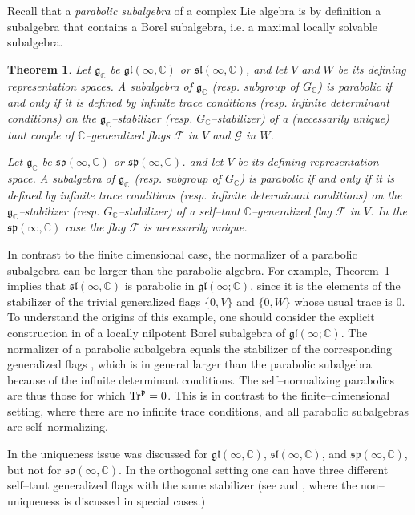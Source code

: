 \documentclass[oneside,leqno,11pt]{article}
\def\gg{\mathfrak{g}}
\def\ggl{\mathfrak{gl}}
\def\gp{\mathfrak{p}}
\def\gsl{\mathfrak{sl}}
\def\gso{\mathfrak{so}}
\def\gsp{\mathfrak{sp}}
\def\Tr{{\rm Tr}}
\def\C{\mathbb{C}}
\def\cF{\mathcal{F}}
\def\cG{\mathcal{G}}
\newtheorem{theorem}[equation]{Theorem}
\begin{document}
Recall that a \emph{parabolic subalgebra} of a complex Lie algebra is by definition a subalgebra that contains a Borel subalgebra, i.e. a maximal locally solvable subalgebra.

\begin{theorem} {\rm \cite{DC2}} \label{complex-parab}
Let $\gg_\C$ be $\ggl(\infty,\C)$ or $\gsl(\infty,\C)$, and let
$V$ and $W$ be its defining representation spaces.
A subalgebra of $\gg_\C$ (resp. subgroup of $G_\C$) is 
parabolic if and only if it is defined by infinite trace conditions 
(resp. infinite determinant conditions) on the 
$\gg_\C$--stabilizer (resp. $G_\C$--stabilizer) of 
a (necessarily unique) taut couple of $\C$--generalized flags $\cF$ 
in $V$ and $\cG$ in $W$.

Let $\gg_\C$ be $\gso(\infty,\C)$ or $\gsp(\infty,\C)$. and let
$V$ be its defining representation space.
A subalgebra of $\gg_\C$ (resp. subgroup of $G_\C$) is 
parabolic if and only if it is defined by infinite trace conditions 
(resp. infinite determinant conditions) on the 
$\gg_\C$--stabilizer (resp. $G_\C$--stabilizer) of 
a self--taut $\C$--generalized flag $\cF$ in $V$.  In the $\gsp(\infty,\C)$ case
the flag $\cF$ is necessarily unique.
\end{theorem}


In contrast to the finite dimensional case, the normalizer
of a parabolic subalgebra can be larger than the 
parabolic algebra.  
 For example, Theorem~\ref{complex-parab} implies that $\gsl(\infty,\C)$ is parabolic in $\ggl(\infty;\C)$, since it is the elements of the stabilizer of the trivial generalized flags  $\{ 0 , V \}$ and $\{ 0 , W \}$ whose usual trace is $0$.
To understand the origins of this example, one should consider the explicit construction in \cite{DP2} of a locally nilpotent Borel subalgebra of $\ggl(\infty;\C)$.
The normalizer of a parabolic subalgebra equals the stabilizer of the corresponding generalized flags \cite{DC2}, which is in general larger than the parabolic subalgebra because of the infinite determinant conditions.   The self--normalizing parabolics are thus those for which $\Tr^\gp = 0$.  
This is in contrast to the finite--dimensional setting, where there are no infinite trace conditions, and all parabolic subalgebras are self--normalizing.

In \cite{DC2} the uniqueness issue was discussed for $\ggl(\infty,\C)$, 
$\gsl(\infty,\C)$, and $\gsp(\infty,\C)$, but not for $\gso(\infty,\C)$.  
In the orthogonal setting one can have three different 
self--taut generalized flags with the same stabilizer 
(see \cite{DC1} and \cite{DP3}, where the non--uniqueness is discussed in 
special cases.)
\end{document}
